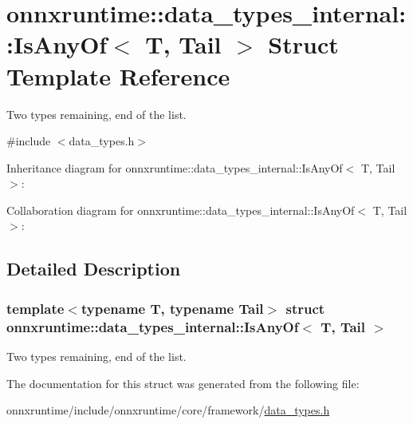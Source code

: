 \hypertarget{structonnxruntime_1_1data__types__internal_1_1IsAnyOf_3_01T_00_01Tail_01_4}{}\section{onnxruntime\+:\+:data\+\_\+types\+\_\+internal\+:\+:Is\+Any\+Of$<$ T, Tail $>$ Struct Template Reference}
\label{structonnxruntime_1_1data__types__internal_1_1IsAnyOf_3_01T_00_01Tail_01_4}


Two types remaining, end of the list.  




{\ttfamily \#include $<$data\+\_\+types.\+h$>$}



Inheritance diagram for onnxruntime\+:\+:data\+\_\+types\+\_\+internal\+:\+:Is\+Any\+Of$<$ T, Tail $>$\+:


Collaboration diagram for onnxruntime\+:\+:data\+\_\+types\+\_\+internal\+:\+:Is\+Any\+Of$<$ T, Tail $>$\+:


\subsection{Detailed Description}
\subsubsection*{template$<$typename T, typename Tail$>$\newline
struct onnxruntime\+::data\+\_\+types\+\_\+internal\+::\+Is\+Any\+Of$<$ T, Tail $>$}

Two types remaining, end of the list. 

The documentation for this struct was generated from the following file\+:\begin{DoxyCompactItemize}
\item 
onnxruntime/include/onnxruntime/core/framework/\mbox{\hyperlink{data__types_8h}{data\+\_\+types.\+h}}\end{DoxyCompactItemize}
